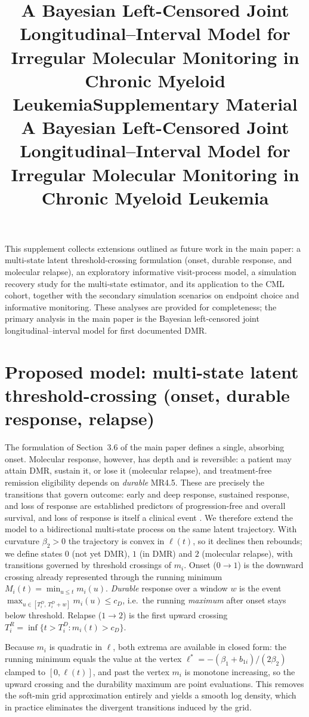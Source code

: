 \documentclass[11pt]{article}
\title{A Bayesian Left-Censored Joint Longitudinal--Interval Model for
Irregular Molecular Monitoring in Chronic Myeloid Leukemia}
\author{}     %
\date{}
\title{Supplementary Material\\[2pt]
\large A Bayesian Left-Censored Joint Longitudinal--Interval Model for
Irregular Molecular Monitoring in Chronic Myeloid Leukemia}
\author{}
\date{}
\begin{document}
\maketitle

\noindent This supplement collects extensions outlined as future work in the
main paper: a multi-state latent threshold-crossing formulation (onset,
durable response, and molecular relapse), an exploratory informative
visit-process model, a simulation recovery study for the multi-state
estimator, and its application to the CML cohort, together with the secondary
simulation scenarios on endpoint choice and informative monitoring. These
analyses are provided for completeness; the primary analysis in the main paper
is the Bayesian left-censored joint longitudinal--interval model for first
documented DMR.

\bigskip
\section{Proposed model: multi-state latent threshold-crossing (onset, durable response, relapse)}
\label{sec:multistate}

The formulation of Section~3.6 of the main paper defines a single, absorbing
onset. Molecular response, however, has depth and is reversible: a patient may
attain DMR, sustain it, or lose it (molecular relapse), and treatment-free
remission eligibility depends on \emph{durable} MR4.5. These are precisely the
transitions that govern outcome: early and deep response, sustained response,
and loss of response are established predictors of progression-free and overall
survival, and loss of response is itself a clinical event
\cite{Li2014TKIEfficacy,Hanfstein2012EMR}. We therefore extend the
model to a bidirectional multi-state process on the same latent trajectory.
With curvature $\beta_2>0$ the trajectory is convex in $\ell(t)$, so it declines
then rebounds; we define states $0$ (not yet DMR), $1$ (in DMR) and $2$
(molecular relapse), with transitions governed by threshold crossings of
$m_i$. Onset ($0\to1$) is the downward crossing already represented through the
running minimum $M_i(t)=\min_{u\le t}m_i(u)$. \emph{Durable} response over a
window $w$ is the event $\max_{u\in[T_i^D,\,T_i^D+w]} m_i(u)\le c_D$, i.e.\ the
running \emph{maximum} after onset stays below threshold. Relapse ($1\to2$) is
the first upward crossing $T_i^{R}=\inf\{t>T_i^D:m_i(t)>c_D\}$.

Because $m_i$ is quadratic in $\ell$, both extrema are available in closed form:
the running minimum equals the value at the vertex
$\ell^{\ast}=-(\beta_1+b_{1i})/(2\beta_2)$ clamped to $[0,\ell(t)]$, and past the
vertex $m_i$ is monotone increasing, so the upward crossing and the durability
maximum are point evaluations. This removes the soft-min grid approximation
entirely and yields a smooth log density, which in practice eliminates the
divergent transitions induced by the grid.
\end{document}
